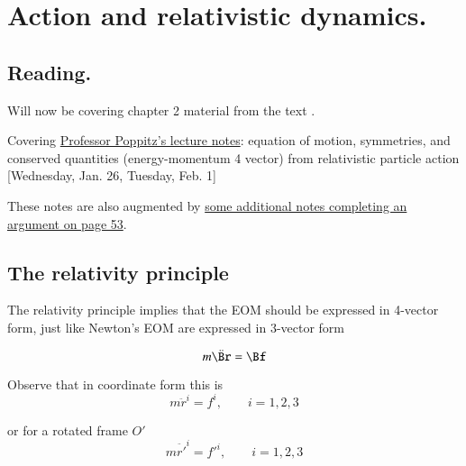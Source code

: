 %
%

\chapter{Action and relativistic dynamics.}
\label{chap:relativisticElectrodynamicsL7}
{}
\date{Jan 26, 2011}

\beginArtNoToc

\section{Reading.}

Will now be covering chapter 2 material from the text \cite{landau1980classical}.

Covering \href{http://www.physics.utoronto.ca/~poppitz/e-poppitz/PHY450_files/RelEMpp52-56.pdf}{Professor Poppitz's lecture notes}: equation of motion, symmetries, and conserved quantities (energy-momentum 4 vector) from relativistic particle action [Wednesday, Jan. 26, Tuesday, Feb. 1]

These notes are also augmented by \href{http://www.physics.utoronto.ca/~poppitz/e-poppitz/PHY450_files/RelEMp53.1.pdf}{some additional notes completing an argument on page 53}.

\section{The relativity principle}

The relativity principle implies that the EOM should be expressed in 4-vector form, just like Newton's EOM are expressed in 3-vector form

\begin{equation}\label{eqn:relativisticElectrodynamicsL7:10}
m \ddot{\Br} = \Bf
\end{equation}

Observe that in coordinate form this is
\begin{equation}\label{eqn:relativisticElectrodynamicsL7:20}
m \ddot{r}^i = f^i, \qquad i = 1,2,3
\end{equation}

or for a rotated frame $O'$
\begin{equation}\label{eqn:relativisticElectrodynamicsL7:30}
m \ddot{r'}^i = {f'}^i, \qquad i = 1,2,3
\end{equation}

